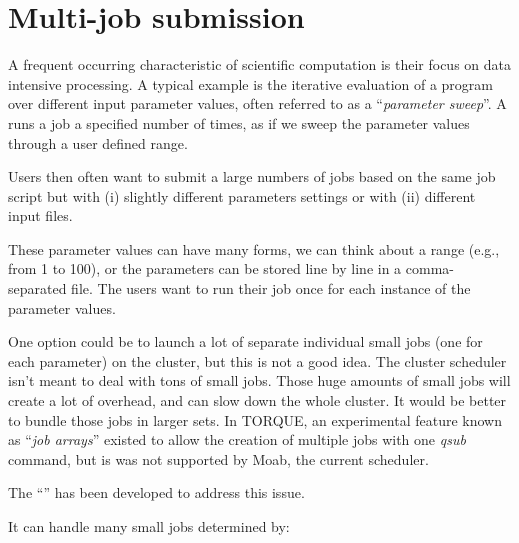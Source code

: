 \chapter{Multi-job submission}

A frequent occurring characteristic of scientific computation is their focus on
data intensive processing. A typical example is the iterative evaluation of a
program over different input parameter values, often referred to as a
``\emph{parameter sweep}''.  A  runs a job a
specified number of times, as if we sweep the parameter values through a user
defined range.

Users then often want to submit a large numbers of jobs based on the same job
script but with (i) slightly different parameters settings or with (ii)
different input files.

These parameter values can have many forms, we can think about a range (e.g.,
from 1 to 100), or the parameters can be stored line by line in a
comma-separated file. The users want to run their job once for each instance of
the parameter values.

One option could be to launch a lot of separate individual small jobs (one for
each parameter) on the cluster, but this is not a good idea. The cluster
scheduler isn't meant to deal with tons of small jobs. Those huge amounts of
small jobs will create a lot of overhead, and can slow down the whole cluster.
It would be better to bundle those jobs in larger sets.  In TORQUE, an
experimental feature known as ``\emph{job arrays}'' existed to allow the
creation of multiple jobs with one \emph{qsub} command, but is was not
supported by Moab, the current scheduler.

The ``'' has been developed to address this issue.

It can handle many small jobs determined by:

